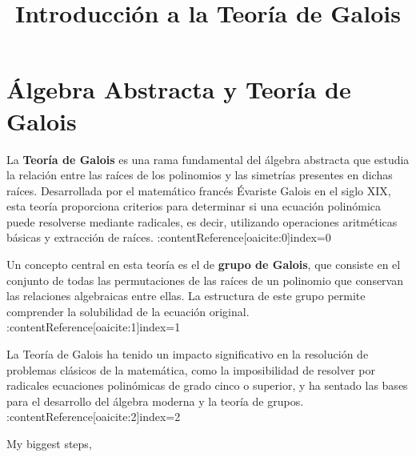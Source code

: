 \documentclass{article}
\title{Introducción a la Teoría de Galois}
\author{}
\date{}
\begin{document}
\maketitle

\section*{Álgebra Abstracta y Teoría de Galois}

La \textbf{Teoría de Galois} es una rama fundamental del álgebra abstracta que estudia la relación entre las raíces de los polinomios y las simetrías presentes en dichas raíces. Desarrollada por el matemático francés Évariste Galois en el siglo XIX, esta teoría proporciona criterios para determinar si una ecuación polinómica puede resolverse mediante radicales, es decir, utilizando operaciones aritméticas básicas y extracción de raíces. :contentReference[oaicite:0]{index=0}

Un concepto central en esta teoría es el de \textbf{grupo de Galois}, que consiste en el conjunto de todas las permutaciones de las raíces de un polinomio que conservan las relaciones algebraicas entre ellas. La estructura de este grupo permite comprender la solubilidad de la ecuación original. :contentReference[oaicite:1]{index=1}

La Teoría de Galois ha tenido un impacto significativo en la resolución de problemas clásicos de la matemática, como la imposibilidad de resolver por radicales ecuaciones polinómicas de grado cinco o superior, y ha sentado las bases para el desarrollo del álgebra moderna y la teoría de grupos. :contentReference[oaicite:2]{index=2}

My biggest steps, 
\end{document}
